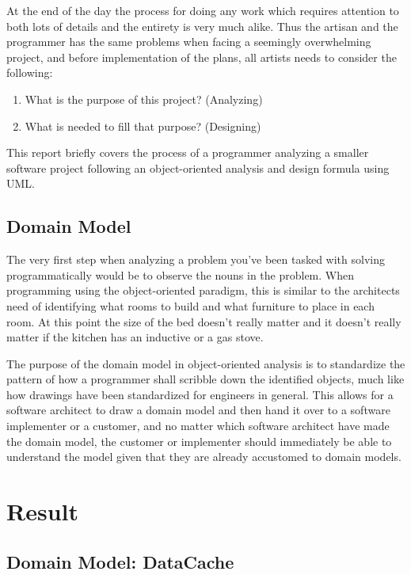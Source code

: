 \documentclass[a4paper]{scrreprt}
\begin{document}
At the end of the day the process for doing any work which requires attention to both lots of details and the entirety is very much alike. Thus the artisan and the programmer has the same problems when facing a seemingly overwhelming project, and before implementation of the plans, all artists needs to consider the following:

\begin{enumerate}
\item What is the purpose of this project? (Analyzing)
\item What is needed to fill that purpose? (Designing)
\end{enumerate}

This report briefly covers the process of a programmer analyzing a smaller software project following an object-oriented analysis and design formula using UML.

\section{Domain Model}
\label{sec:domainmodel}
The very first step when analyzing a problem you've been tasked with solving programmatically would be to observe the nouns in the problem. When programming using the object-oriented paradigm, this is similar to the architects need of identifying what rooms to build and what furniture to place in each room. At this point the size of the bed doesn't really matter and it doesn't really matter if the kitchen has an inductive or a gas stove.

The purpose of the domain model in object-oriented analysis is to standardize the pattern of how a programmer shall scribble down the identified objects, much like how drawings have been standardized for engineers in general. This allows for a software architect to draw a domain model and then hand it over to a software implementer or a customer, and no matter which software architect have made the domain model, the customer or implementer should immediately be able to understand the model given that they are already accustomed to domain models.


\chapter{Result}
\label{sec:result}

\section{Domain Model: DataCache}
\label{sec:datacachedomainmodel}
\end{document}
